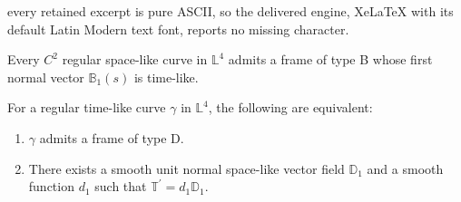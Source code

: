 \documentclass[10pt,a4paper]{amsart}
\newcommand{\LL}{\mathbb{L}}
\begin{document}
every retained excerpt is pure ASCII, so the delivered engine, XeLaTeX with its default Latin Modern text font, reports no missing character.
\begin{lemma}\label{lemma:1}
Every $C^{2}$ regular space-like curve in $\LL^{4}$ admits a frame of type B whose first normal vector $\mathbb{B}_{1}(s)$ is time-like. 
\end{lemma}

\begin{proposition}\label{proposition:1}
For a regular time-like curve $\gamma$ in $\LL^{4}$, the following are equivalent:
\begin{enumerate}
    \item $\gamma$ admits a frame of type D.
    \item There exists a smooth unit normal space-like vector field $\mathbb{D}_{1}$ and a smooth function $d_1$ such that  $\mathbb{T}^{\prime}=d_{1}\mathbb{D}_{1}$.
\end{enumerate}
\end{proposition}
\end{document}
